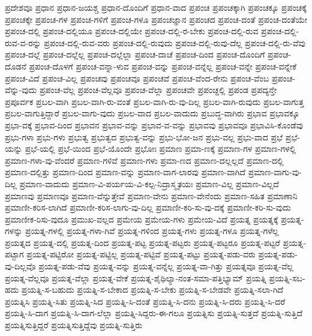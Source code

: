 {ಪ್ರದೇಶವೂ
ಪ್ರಧಾನ
ಪ್ರಧಾನ-ಜಯಶ್ಚ
ಪ್ರಧಾನ-ದೊಂದಿಗೆ
ಪ್ರಧಾನ-ವಾದ
ಪ್ರಪಂಚ
ಪ್ರಪಂಚಕ್ಕಾಗಿ
ಪ್ರಪಂಚಕ್ಕೂ
ಪ್ರಪಂಚಕ್ಕೆ
ಪ್ರಪಂಚಕ್ಕೇ
ಪ್ರಪಂಚ-ಗಳ
ಪ್ರಪಂಚ-ಗಳಿಗೆ
ಪ್ರಪಂಚ-ಗಳೂ
ಪ್ರಪಂಚಜ್ಞಾನ
ಪ್ರಪಂಚದ
ಪ್ರಪಂಚ-ದಂತೆ
ಪ್ರಪಂಚ-ದಂತೆಯೇ
ಪ್ರಪಂಚ-ದಲ್ಲಿ
ಪ್ರಪಂಚ-ದಲ್ಲಿಯೂ
ಪ್ರಪಂಚ-ದಲ್ಲಿಯೇ
ಪ್ರಪಂಚ-ದಲ್ಲಿ-ರ-ಬೇಕು
ಪ್ರಪಂಚ-ದಲ್ಲಿ-ರುವ
ಪ್ರಪಂಚ-ದಲ್ಲಿ-ರುವ-ವ-ರನ್ನು
ಪ್ರಪಂಚ-ದಲ್ಲಿ-ರುವ-ವರು
ಪ್ರಪಂಚ-ದಲ್ಲಿ-ರುವುದು
ಪ್ರಪಂಚ-ದಲ್ಲಿ-ರುವು-ದೆಲ್ಲ
ಪ್ರಪಂಚ-ದಲ್ಲಿ-ರು-ವೆವು
ಪ್ರಪಂಚ-ದಲ್ಲೆ
ಪ್ರಪಂಚ-ದಲ್ಲೆಲ್ಲ
ಪ್ರಪಂಚ-ದಲ್ಲೆಲ್ಲಾ
ಪ್ರಪಂಚ-ದಾಚೆ
ಪ್ರಪಂಚ-ದಿಂದ
ಪ್ರಪಂಚ-ದೊಂದಿಗೆ
ಪ್ರಪಂಚ-ದೊಡನೆ
ಪ್ರಪಂಚ-ದೊಳಗೆ
ಪ್ರಪಂಚ-ವನ್ನಾ-ಳುವ
ಪ್ರಪಂಚ-ವನ್ನು
ಪ್ರಪಂಚ-ವನ್ನೆಲ್ಲ
ಪ್ರಪಂಚ-ವನ್ನೇ
ಪ್ರಪಂಚ-ವನ್ನೇಕೆ
ಪ್ರಪಂಚ-ವಿದೆ
ಪ್ರಪಂಚ-ವಿಲ್ಲ
ಪ್ರಪಂಚವು
ಪ್ರಪಂಚವೂ
ಪ್ರಪಂಚವೆ
ಪ್ರಪಂಚ-ವೆಂದ-ರೇನು
ಪ್ರಪಂಚ-ವೆಂಬ
ಪ್ರಪಂಚ-ವೆನ್ನು-ವುದು
ಪ್ರಪಂಚ-ವೆಲ್ಲ
ಪ್ರಪಂಚ-ವೆಲ್ಲವೂ
ಪ್ರಪಂಚ-ವೆಲ್ಲಾ
ಪ್ರಪಂಚವೇ
ಪ್ರಪಂಚ್ದಲ್ಲಿ
ಪ್ರಪಂಡ
ಪ್ರಪದ್ಯನ್ತೇ
ಪ್ರಪೂರ್ವಕ
ಪ್ರಬಲ-ವಾಗಿ
ಪ್ರಬಲ-ವಾಗಿ-ರು-ವಂತೆ
ಪ್ರಬಲ-ವಾಗಿ-ರು-ವು-ದಿಲ್ಲ
ಪ್ರಬಲ-ವಾಗಿ-ರುವುದು
ಪ್ರಬಲ-ವಾಗುತ್ತ
ಪ್ರಬಲ-ವಾಗುತ್ತಿದ್ದಾರೆ
ಪ್ರಬಲ-ವಾಗು-ವುದು
ಪ್ರಬಲ-ವಾದ
ಪ್ರಬಲ-ವಾದುದು
ಪ್ರಬುದ್ಧ-ವಾಗಿರು
ಪ್ರಭಾವ
ಪ್ರಭಾವಕ್ಕೂ
ಪ್ರಭಾ-ವಕ್ಕೆ
ಪ್ರಭಾವ-ದಿಂದ
ಪ್ರಭಾವನ
ಪ್ರಭಾವ-ವನ್ನು
ಪ್ರಭಾವ-ವ-ವನ್ನು
ಪ್ರಭಾವವು
ಪ್ರಭಾವವೂ
ಪ್ರಭಾವಿಸಿ-ಕೊಂಡೆವು
ಪ್ರಭು-ಗಳಾ
ಪ್ರಭು-ಗಳು
ಪ್ರಭುತ್ವ
ಪ್ರಭುತ್ವದ
ಪ್ರಭುತ್ವ-ವನ್ನು
ಪ್ರಭು-ಭೋ-ಜನ
ಪ್ರಭು-ವಲ್ಲ
ಪ್ರಭು-ವಾದ
ಪ್ರಭೆ
ಪ್ರಭೆ-ಯನ್ನು
ಪ್ರಭೆ-ಯಲ್ಲಿ
ಪ್ರಭೆ-ಯಿಂದ
ಪ್ರಭೆ-ಯೊಂದೇ
ಪ್ರಭೋಃ
ಪ್ರಮಾಣ
ಪ್ರಮಾ-ಣಕ್ಕೆ
ಪ್ರಮಾಣ-ಗಳ
ಪ್ರಮಾಣ-ಗಳಲ್ಲಿ
ಪ್ರಮಾಣ-ಗಳಾ-ವು-ವೆಂದರೆ
ಪ್ರಮಾಣ-ಗಳಿವೆ
ಪ್ರಮಾಣ-ಗಳು
ಪ್ರಮಾ-ಣದ
ಪ್ರಮಾಣ-ದಲ್ಲಲ್ಲದೆ
ಪ್ರಮಾಣ-ದಲ್ಲಿ
ಪ್ರಮಾಣ-ದಲ್ಲಿತ್ತು
ಪ್ರಮಾಣ-ದಿಂದ
ಪ್ರಮಾಣ-ವನ್ನು
ಪ್ರಮಾಣ-ವಾಗ-ಲಾರವು
ಪ್ರಮಾಣ-ವಾಗಿದೆ
ಪ್ರಮಾಣ-ವಾಗು-ವು-ದಿಲ್ಲ
ಪ್ರಮಾಣ-ವಾದುದು
ಪ್ರಮಾಣ-ವಿ-ಪರ್ಯಯ-ವಿ-ಕಲ್ಪ-ನಿದ್ರಾಸ್ಮೃತಯಃ
ಪ್ರಮಾಣ-ವಿಲ್ಲ
ಪ್ರಮಾಣ-ವಿಲ್ಲದೆ
ಪ್ರಮಾಣವು
ಪ್ರಮಾಣವೂ
ಪ್ರಮಾಣ-ವೆನ್ನುತ್ತೇವೆ
ಪ್ರಮಾಣ-ವೇನು
ಪ್ರಮಾಣ-ವೇನೆಂದು
ಪ್ರಮಾಣ-ಸಹಿತ
ಪ್ರಮಾಣಾನಿ
ಪ್ರಮಾಣೀ-ಕರಿಸ-ಲಾಗಿದೆ
ಪ್ರಮಾಣೀ-ಕರಿಸ-ಲಾಗು-ವು-ದಿಲ್ಲ
ಪ್ರಮಾಣೀ-ಕರಿ-ಸು-ವು-ದಕ್ಕೆ
ಪ್ರಮಾಣೀ-ಕರಿ-ಸು-ವುದು
ಪ್ರಮಾಣೀಕ-ರಿಸು-ವುದೂ
ಪ್ರಮುಖ-ವಲ್ಲದ
ಪ್ರಮೇಯ
ಪ್ರಮೇಯ-ಗಳು
ಪ್ರಮೇಯ-ವಿದೆ
ಪ್ರಯತ್ನ
ಪ್ರಯತ್ನಕ್ಕೆ
ಪ್ರಯತ್ನ-ಗಳನ್ನು
ಪ್ರಯತ್ನ-ಗಳಲ್ಲಿ
ಪ್ರಯತ್ನ-ಗಳಾ-ಗಿವೆ
ಪ್ರಯತ್ನ-ಗಳಿಂದ
ಪ್ರಯತ್ನ-ಗಳು
ಪ್ರಯತ್ನ-ಗಳೂ
ಪ್ರಯತ್ನ-ಗಳೆಲ್ಲ
ಪ್ರಯತ್ನದ
ಪ್ರಯತ್ನ-ದಲ್ಲಿ
ಪ್ರಯತ್ನ-ದಿಂದ
ಪ್ರಯತ್ನ-ಪಟ್ಟ
ಪ್ರಯತ್ನ-ಪಟ್ಟರು
ಪ್ರಯತ್ನ-ಪಟ್ಟರೂ
ಪ್ರಯತ್ನ-ಪಟ್ಟರೆ
ಪ್ರಯತ್ನ-ಪಟ್ಟಾಗ
ಪ್ರಯತ್ನ-ಪಟ್ಟಿರೋ
ಪ್ರಯತ್ನ-ಪಟ್ಟಿಲ್ಲ
ಪ್ರಯತ್ನ-ಪಟ್ಟಿವೆ
ಪ್ರಯತ್ನ-ಪಟ್ಟು
ಪ್ರಯತ್ನ-ಪಡು-ವರು
ಪ್ರಯತ್ನ-ಪಡು-ವು-ದಿಲ್ಲವೊ
ಪ್ರಯತ್ನ-ಪಡು-ವೆವು
ಪ್ರಯತ್ನ-ವನ್ನು
ಪ್ರಯತ್ನ-ವನ್ನೆಲ್ಲ
ಪ್ರಯತ್ನ-ವಾ-ಗಿತ್ತು
ಪ್ರಯತ್ನವೂ
ಪ್ರಯತ್ನ-ವೆಲ್ಲ
ಪ್ರಯತ್ನ-ವೆಲ್ಲವೂ
ಪ್ರಯತ್ನ-ವೆಲ್ಲಾ
ಪ್ರಯತ್ನ-ವೇಕೆ
ಪ್ರಯತ್ನ-ಶೈಥಿಲ್ಯಾ-ನಂತ-ಸಮಾ-ಪತ್ತಿಭ್ಯಾಮ್
ಪ್ರಯತ್ನಿ
ಪ್ರಯತ್ನಿ-ಸಬ-ಹದು
ಪ್ರಯತ್ನಿ-ಸ-ಬಹುದು
ಪ್ರಯತ್ನಿ-ಸ-ಬೇಕಾದ
ಪ್ರಯತ್ನಿ-ಸ-ಬೇಕು
ಪ್ರಯತ್ನಿ-ಸ-ಬೇಡವೇ
ಪ್ರಯತ್ನಿ-ಸಲಾ-ಗಿದೆ
ಪ್ರಯತ್ನಿಸಿ
ಪ್ರಯತ್ನಿ-ಸಿತು
ಪ್ರಯತ್ನಿ-ಸಿದ
ಪ್ರಯತ್ನಿ-ಸಿ-ದಂತೆ
ಪ್ರಯತ್ನಿ-ಸಿ-ದನು
ಪ್ರಯತ್ನಿ-ಸಿ-ದರು
ಪ್ರಯತ್ನಿ-ಸಿ-ದರೆ
ಪ್ರಯತ್ನಿ-ಸಿ-ದಾಗ
ಪ್ರಯತ್ನಿ-ಸಿ-ದಾಗ-ಲೆಲ್ಲಾ
ಪ್ರಯತ್ನಿ-ಸಿದ್ದರು-ಈ-ಗಲೂ
ಪ್ರಯತ್ನಿಸು
ಪ್ರಯತ್ನಿ-ಸುತ್ತದೆ
ಪ್ರಯತ್ನಿ-ಸುತ್ತಿದೆ
ಪ್ರಯತ್ನಿಸುತ್ತಿದ್ದರೆ
ಪ್ರಯತ್ನಿಸುತ್ತಿದ್ದೆವು
ಪ್ರಯತ್ನಿ-ಸುತ್ತಿರು
}
